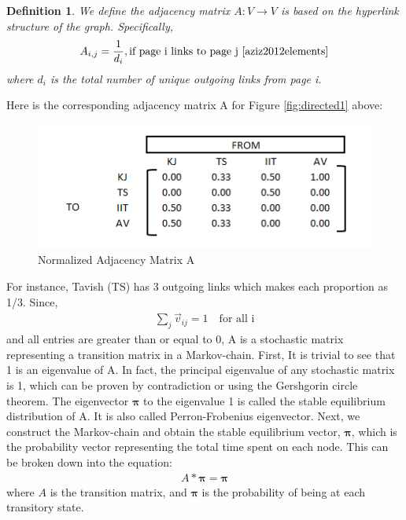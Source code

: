 \documentclass[10pt]{siamltex}
\newtheorem{mydef}{Definition}
\begin{document}
\vspace{5mm}
\begin{mydef}
We define the adjacency matrix $A: V \rightarrow V$ is based on the hyperlink structure of the graph.  Specifically,
\begin{align}
A_{i,j} = \frac{1}{d_i}, \text{if page i links to page j \cite{aziz2012elements}}
\end{align} where $d_i$ is the total number of unique outgoing links from page i.
\end{mydef}

Here is the corresponding adjacency matrix A for Figure \ref{fig:directed1} above:

\begin{figure}[ht]
\begin{center}
\includegraphics[width=0.56\columnwidth]{matrix1}
\end{center}
\caption{Normalized Adjacency Matrix A \cite{analyticsvidhya} }
\label{fig:matrix1}
\end{figure}
For instance, Tavish (TS) has 3 outgoing links which makes each proportion as 1/3.
\newline
Since,
\begin{align}
\sum_{j} \vec{v}_{ij} = 1 \quad \textrm{for all i}
\end{align}
and all entries are greater than or equal to 0, A is a stochastic matrix representing a transition matrix in a Markov-chain.
\newline
First, It is trivial to see that 1 is an eigenvalue of A.  In fact, the principal eigenvalue of any stochastic matrix is 1, which can be proven by contradiction or using the Gershgorin circle theorem.  The eigenvector  $\boldsymbol{\pi}$ to the eigenvalue 1 is called the stable equilibrium distribution of A. It is also called Perron-Frobenius eigenvector. \cite{knill}
\newline
Next, we construct the Markov-chain and obtain the stable equilibrium vector, $\boldsymbol{\pi}$, which is the probability vector representing the total time spent on each node.  This can be broken down into the equation:
\begin{align}
A * \boldsymbol{\pi} = \boldsymbol{\pi}
\end{align}
where $A$ is the transition matrix, and $\boldsymbol{\pi}$ is the probability of being at each transitory state.
\end{document}
